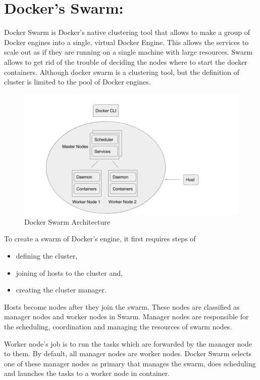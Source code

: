 \section{Docker's Swarm:}
\label{sec:swarm}
Docker Swarm is Docker’s native clustering tool that allows to make a group of Docker engines into a single, virtual Docker Engine. This allows the services to scale out as if they are running on a single machine with large resources. Swarm allows to get rid of the trouble of deciding the nodes where to start the docker containers. Although docker swarm is a clustering tool, but the definition of cluster is limited to the pool of Docker engines. 

\begin{figure}
\centering
\includegraphics[scale=0.5]{./fig/swarm}
\caption{Docker Swarm Architecture}
\label{fig:swarmArch}
\end{figure}

To create a swarm of Docker’s engine, it first requires steps of
\begin{itemize}
\item defining the cluster,
\item joining of hosts to the cluster and,
\item creating the cluster manager. 
\end{itemize}
Hosts become nodes after they join the swarm. These nodes are classified as manager nodes and worker nodes in Swarm. Manager nodes are responsible for the scheduling, coordination and managing the resources of swarm nodes.

Worker node’s job is to run the tasks which are forwarded by the manager node to them. By default, all manager nodes are worker nodes. Docker Swarm selects one of these  manager nodes as primary that manages the swarm, does scheduling and launches the tasks to a worker node in container. 

